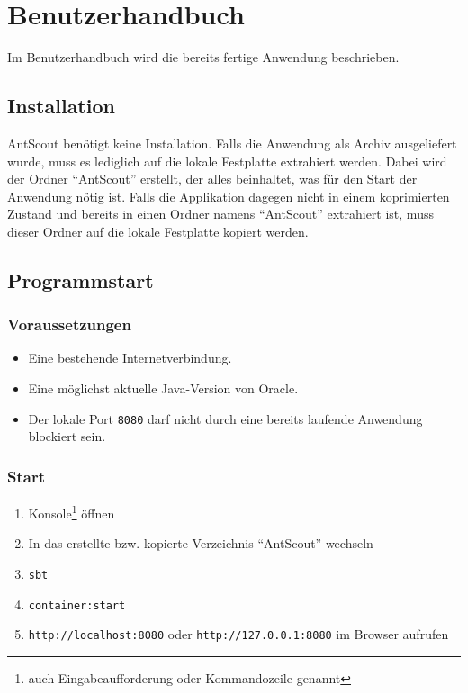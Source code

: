 \chapter{Benutzerhandbuch}
\label{chap:benutzerhandbuch}

Im Benutzerhandbuch wird die bereits fertige Anwendung beschrieben.


\section{Installation}
\label{sec:installation}

AntScout benötigt keine Installation.
Falls die Anwendung als Archiv ausgeliefert wurde, muss es lediglich auf die lokale Festplatte extrahiert werden.
Dabei wird der Ordner ``AntScout'' erstellt, der alles beinhaltet, was für den Start der Anwendung nötig ist.
Falls die Applikation dagegen nicht in einem koprimierten Zustand und bereits in einen Ordner namens ``AntScout'' extrahiert ist, muss dieser Ordner auf die lokale Festplatte kopiert werden.

\section{Programmstart}
\label{sec:programmstart}

\subsection{Voraussetzungen}
\label{sec:voraussetzungen}

\begin{itemize}
  \item Eine bestehende Internetverbindung.
  \item Eine möglichst aktuelle Java-Version von Oracle.
  \item Der lokale Port \texttt{8080} darf nicht durch eine bereits laufende Anwendung blockiert sein.
\end{itemize}

\subsection{Start}
\label{sec:start}

\begin{enumerate}
  \item Konsole\footnote{auch Eingabeaufforderung oder Kommandozeile genannt} öffnen
  \item In das erstellte bzw. kopierte Verzeichnis ``AntScout'' wechseln
  \item \texttt{sbt}
  \item \texttt{container:start}
  \item \texttt{http://localhost:8080} oder \texttt{http://127.0.0.1:8080} im Browser aufrufen
\end{enumerate}

